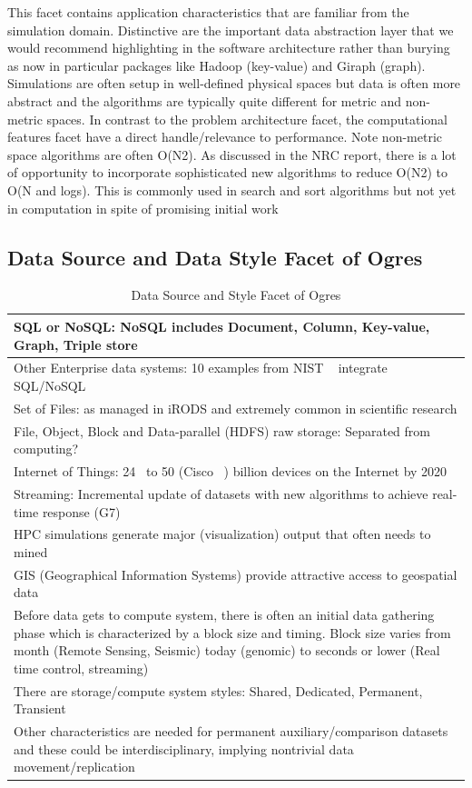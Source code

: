\documentclass{acm_proc_article-sp}
\begin{document}
This facet contains application characteristics that are familiar from the simulation domain. Distinctive are the important data abstraction layer that we would recommend highlighting in the software architecture rather than burying as now in particular packages like Hadoop (key-value) and Giraph (graph). Simulations are often setup in well-defined physical spaces but data is often more abstract and the algorithms are typically quite different for metric and non-metric spaces. In contrast to the problem architecture facet, the computational features facet have a direct handle/relevance to performance. Note non-metric space algorithms are often O(N2). As discussed in the NRC report, there is a lot of opportunity to incorporate sophisticated new algorithms to reduce O(N2) to O(N and logs). This is commonly used in search and sort algorithms but not yet in computation in spite of promising initial work~\cite{b13,b23,b19}

\subsection{Data Source and Data Style Facet of Ogres}
\begin{table}
\centering
\caption{ Data Source and Style Facet of Ogres}
\label{Table8}
\begin{tabular}{|p{12cm}|} \hline
SQL or NoSQL: NoSQL includes Document, Column, Key-value, Graph, Triple store \\ \hline
Other Enterprise data systems: 10 examples from NIST ~\cite{bb} integrate SQL/NoSQL \\ \hline
Set of Files: as managed in iRODS and extremely common in scientific research \\ \hline
File, Object, Block and Data-parallel (HDFS) raw storage: Separated from computing? \\ \hline
Internet of Things: 24 ~\cite{b22}to 50 (Cisco ~\cite{b11,b12}) billion devices on the Internet by 2020 \\ \hline
Streaming: Incremental update of datasets with new algorithms to achieve real-time response (G7) \\ \hline
HPC simulations generate major (visualization) output that often needs to mined \\ \hline
GIS (Geographical Information Systems) provide attractive access to geospatial data \\ \hline
Before data gets to compute system, there is often an initial data gathering phase which is characterized by a block size and timing. Block size varies from month (Remote Sensing, Seismic) today (genomic) to seconds or lower (Real time control, streaming)\\ \hline
There are storage/compute system styles: Shared, Dedicated, Permanent, Transient \\ \hline
Other characteristics are needed for permanent auxiliary/comparison datasets and these could be interdisciplinary, implying nontrivial data movement/replication

\\ \hline
\end{tabular}
\end{table}
\end{document}

